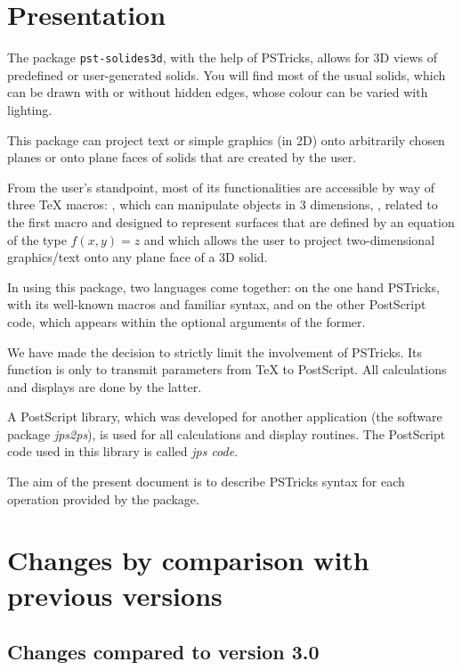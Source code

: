

\section {Presentation}

The package \texttt{pst-solides3d}, with the help of PSTricks,
allows for 3D views of predefined or user-generated solids. You
will find most of the usual solids, which can be drawn with or
without hidden edges, whose colour can be varied with lighting.

This package can project text or simple graphics (in 2D) onto
arbitrarily chosen planes or onto plane faces of solids that are
created by the user.

From the user's standpoint, most of its functionalities are
accessible by way of three \TeX{} macros: , which can
manipulate objects in 3 dimensions, , related to the
first macro and designed to represent surfaces that are defined by
an equation of the type $f(x,y) = z$ and  which
allows the user to project two-dimensional graphics/text onto any
plane face of a 3D solid.

In using this package, two languages come together: on the one
hand PSTricks, with its well-known macros and familiar syntax, and
on the other PostScript code, which appears within the optional
arguments of the former.

We have made the decision to strictly limit the involvement of
PSTricks. Its function is only to transmit parameters from \TeX{}
to PostScript. All calculations and displays are done by the
latter.

A PostScript library, which was developed for another application
(the software package \textit{jps2ps}), is used for all
calculations and display routines. The PostScript code used in
this library is called \textit{jps code}.

The aim of the present document is to describe PSTricks syntax for
each operation provided by the package.


\section{Changes by comparison with previous versions}

\subsection{Changes compared to version 3.0}

